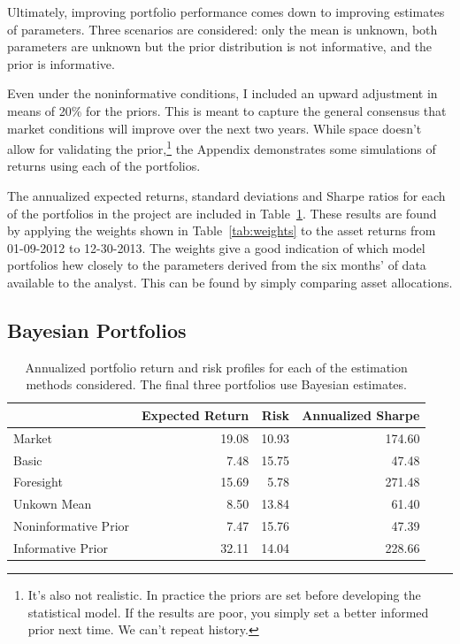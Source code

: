 \documentclass[a4paper]{article}\usepackage[]{graphicx}\usepackage[]{color}
\begin{document}
Ultimately, improving portfolio performance comes down to improving estimates of parameters. Three scenarios are considered: only the mean is unknown, both parameters are unknown but the prior distribution is not informative, and the prior is informative.

Even under the noninformative conditions, I included an upward adjustment in means of 20\% for the priors. This is meant to capture the general consensus that market conditions will improve over the next two years. While space doesn't allow for validating the prior,\footnote{It's also not realistic. In practice the priors are set before developing the statistical model. If the results are poor, you simply set a better informed prior next time. We can't repeat history.} the Appendix demonstrates some simulations of returns using each of the portfolios. 

The annualized expected returns, standard deviations and Sharpe ratios for each of the portfolios in the project are included in Table~\ref{tab:results}. These results are found by applying the weights shown in Table~\ref{tab:weights} to the asset returns from 01-09-2012 to 12-30-2013. The weights give a good indication of which model portfolios hew closely to the parameters derived from the six months' of data available to the analyst. This can be found by simply comparing asset allocations.

\subsection{Bayesian Portfolios}

\begin{table}[ht]
\centering
\begin{tabular}{lrrr}
  \hline
 & Expected Return & Risk & Annualized Sharpe \\ 
  \hline
Market & 19.08 & 10.93 & 174.60 \\ 
  Basic & 7.48 & 15.75 & 47.48 \\ 
  Foresight & 15.69 & 5.78 & 271.48 \\ 
  Unkown Mean & 8.50 & 13.84 & 61.40 \\ 
  Noninformative Prior & 7.47 & 15.76 & 47.39 \\ 
  Informative Prior & 32.11 & 14.04 & 228.66 \\ 
   \hline
\end{tabular}
\caption{Annualized portfolio return and risk profiles for each of the estimation methods considered. The final three portfolios use Bayesian estimates.} 
\label{tab:results}
\end{table}
\end{document}
